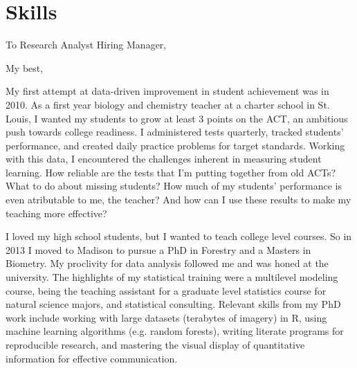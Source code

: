 \documentclass[11pt, sans]{moderncv}
\begin{document}
\section*{Skills}
\label{sec:org7f4e1bf}

\clearpage
{}
\date{\today}
\opening{To Research Analyst Hiring Manager,}
\closing{My best,}
\makelettertitle

My first attempt at data-driven improvement in student achievement was
in 2010.  As a first year biology and chemistry teacher at a charter
school in St. Louis, I wanted my students to grow at least 3 points on
the ACT, an ambitious push towards college readiness.  I administered
tests quarterly, tracked students' performance, and created daily
practice problems for target standards.  Working with this data, I
encountered the challenges inherent in measuring student learning.
How reliable are the tests that I'm putting together from old ACTs?
What to do about missing students?  How much of my students'
performance is even atributable to me, the teacher?  And how can I use
these results to make my teaching more effective?

I loved my high school students, but I wanted to teach college level
courses.  So in 2013 I moved to Madison to pursue a PhD in Forestry
and a Masters in Biometry.  My proclivity for data analysis followed
me and was honed at the university.  The highlights of my statistical
training were a multilevel modeling course, being the teaching
assistant for a graduate level statistics course for natural science
majors, and statistical consulting.  Relevant skills from my PhD work
include working with large datasets (terabytes of imagery) in R, using
machine learning algorithms (e.g. random forests), writing literate
programs for reproducible research, and mastering the visual display
of quantitative information for effective communication.
\end{document}
